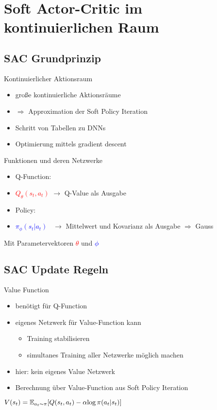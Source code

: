 \section{Soft Actor-Critic im kontinuierlichen Raum}
\subsection{SAC Grundprinzip}

\begin{frame}{Kontinuierlicher Aktionsraum}
\begin{itemize}
\item große kontinuierliche Aktionsräume
\item[] $\Rightarrow$ Approximation der Soft Policy Iteration \\[12pt]
\item Schritt von Tabellen zu DNNs
\item Optimierung mittels gradient descent
\end{itemize}
\end{frame}

\begin{frame}{Funktionen und deren Netzwerke}
\begin{itemize}
\item Q-Function:
\item[] \textcolor{red}{$Q_{\theta}(s_{t},a_{t})$}	$\rightarrow$ Q-Value als Ausgabe \\[6pt]
\item Policy:
\item[] \textcolor{blue}{$\pi_{\phi}(s_{t}|a_{t})$} \,	$\rightarrow$ Mittelwert und Kovarianz als Ausgabe $\Rightarrow$ Gauss \\[12pt]
\end{itemize}
Mit Parametervektoren \textcolor{red}{$\theta$} und \textcolor{blue}{$\phi$}
\end{frame}

\subsection{SAC Update Regeln}

\begin{frame}{Value Function}
\begin{itemize}
\item benötigt für Q-Function
\item eigenes Netzwerk für Value-Function kann
\begin{itemize}
\item Training stabilisieren
\item simultanes Training aller Netzwerke möglich machen \\[12pt]
\end{itemize}
\item hier: kein eigenes Value Netzwerk
\item Berechnung über Value-Function aus Soft Policy Iteration \\[6pt]
\end{itemize}
\center ${V}(s_{t}) = \mathbb{E}_{a_t \sim \pi}[\mathnormal{Q}(s_t, a_t) - \alpha \mathrm{log} \, \pi (a_t|s_t)]$
\end{frame}

